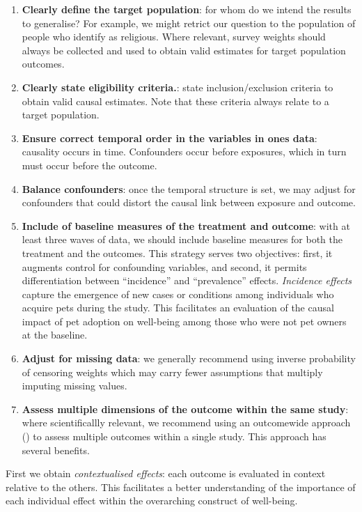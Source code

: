 \documentclass[
  singlecolumn]{article}
\begin{document}
\begin{enumerate}
\def\labelenumi{\arabic{enumi}.}
\setcounter{enumi}{1}
\item
  \textbf{Clearly define the target population}: for whom do we intend
  the results to generalise? For example, we might retrict our question
  to the population of people who identify as religious. Where relevant,
  survey weights should always be collected and used to obtain valid
  estimates for target population outcomes.
\item
  \textbf{Clearly state eligibility criteria.}: state
  inclusion/exclusion criteria to obtain valid causal estimates. Note
  that these criteria always relate to a target population.
\item
  \textbf{Ensure correct temporal order in the variables in ones data}:
  causality occurs in time. Confounders occur before exposures, which in
  turn must occur before the outcome.
\item
  \textbf{Balance confounders}: once the temporal structure is set, we
  may adjust for confounders that could distort the causal link between
  exposure and outcome.
\item
  \textbf{Include of baseline measures of the treatment and outcome}:
  with at least three waves of data, we should include baseline measures
  for both the treatment and the outcomes. This strategy serves two
  objectives: first, it augments control for confounding variables, and
  second, it permits differentiation between ``incidence'' and
  ``prevalence'' effects. \emph{Incidence effects} capture the emergence
  of new cases or conditions among individuals who acquire pets during
  the study. This facilitates an evaluation of the causal impact of pet
  adoption on well-being among those who were not pet owners at the
  baseline.
\item
  \textbf{Adjust for missing data}: we generally recommend using inverse
  probability of censoring weights which may carry fewer assumptions
  that multiply imputing missing values.
\item
  \textbf{Assess multiple dimensions of the outcome within the same
  study}: where scientificallly relevant, we recommend using an
  outcomewide approach () to assess multiple outcomes within a single
  study. This approach has several benefits.
\end{enumerate}

First we obtain \emph{contextualised effects}: each outcome is evaluated
in context relative to the others. This facilitates a better
understanding of the importance of each individual effect within the
overarching construct of well-being.
\end{document}
